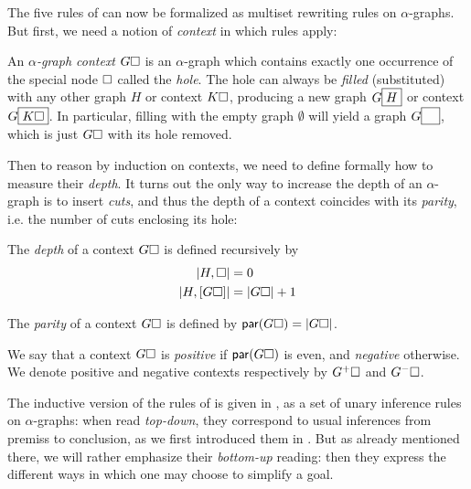 The five rules of  can now be formalized as multiset rewriting rules
on $\alpha$-graphs. But first, we need a notion of \emph{context} in which rules
apply:

\begin{definition}
  An \emph{$\alpha$-graph context} $G\square$ is an $\alpha$-graph which contains
  exactly one occurrence of the special node $\square$ called the \emph{hole}.
  The hole can always be \emph{filled} (substituted) with any other graph $H$ or
  context $K\square$, producing a new graph $G\fbox{$H$}$ or context
  $G\fbox{$K\square$}$. In particular, filling with the empty graph $\emptyset$
  will yield a graph $G\fbox{$\phantom{G}$}$, which is just $G\square$ with its
  hole removed.
\end{definition}

Then to reason by induction on contexts, we need to define formally how to
measure their \emph{depth}. It turns out the only way to increase the depth of
an $\alpha$-graph is to insert \emph{cuts}, and thus the depth of a context
coincides with its \emph{parity}, i.e. the number of cuts enclosing its hole:

\begin{definition}[Depth]
  The \emph{depth} of a context $G\square$ is defined recursively by
  \begin{align*}
    \left|H, \square\right| &= 0 \\
    \left|H, [G\square]\right| &= \left|G\square\right| + 1
  \end{align*}
\end{definition}

\begin{definition}[Parity]
  The \emph{parity} of a context $G\square$ is defined by $\mathsf{par}(G\square) =
  \left|G\square\right|$.
\end{definition}

\begin{definition}[Polarity]
  We say that a context $G\square$ is \emph{positive} if $\mathsf{par}(G\square)$ is
  even, and \emph{negative} otherwise. We denote positive and negative contexts
  respectively by $G^+\square$ and $G^-\square$.
\end{definition}

The inductive version of the rules of  is given in , as
a set of unary inference rules on $\alpha$-graphs: when read \emph{top-down},
they correspond to usual inferences from premiss to conclusion, as we first
introduced them in .
But as already mentioned there, we will rather emphasize their \emph{bottom-up}
reading: then they express the different ways in which one may choose to
simplify a goal.

